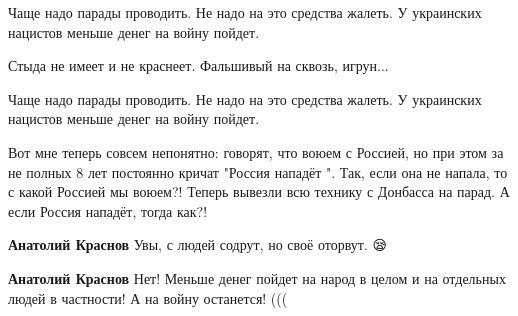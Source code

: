 \begin{itemize}
Чаще надо парады проводить. Не надо на это средства жалеть. У украинских нацистов меньше денег на войну пойдет.

 
Стыда не имеет и не краснеет. Фальшивый на сквозь, игрун...

 
Чаще надо парады проводить. Не надо на это средства жалеть. У украинских нацистов меньше денег на войну пойдет.

\begin{itemize}
 
Вот мне теперь совсем непонятно: говорят, что воюем с Россией, но при этом за не полных 8 лет постоянно кричат "Россия нападёт ". Так, если она не напала, то с какой Россией мы воюем?! Теперь вывезли всю технику с Донбасса на парад. А если Россия нападёт, тогда как?!

 
\textbf{Анатолий Краснов} Увы, с людей содрут, но своё оторвут. 😪

 
\textbf{Анатолий Краснов} Нет! Меньше денег пойдет на народ в целом и на отдельных людей в частности! А на войну останется! (((
\end{itemize}


\end{itemize}
